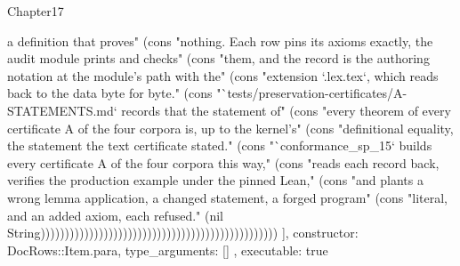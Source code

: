 \begin{lexlean}{Chapter17}
\begin{semanticmodule}
{{a definition that proves" (cons "nothing. Each row pins its axioms exactly, the audit module prints and checks" (cons "them, and the record is the authoring notation at the module's path with the" (cons "extension `.lex.tex`, which reads back to the data byte for byte." (cons "`tests/preservation-certificates/A-STATEMENTS.md` records that the statement of" (cons "every theorem of every certificate A of the four corpora is, up to the kernel's" (cons "definitional equality, the statement the text certificate stated." (cons "`conformance_sp_15` builds every certificate A of the four corpora this way," (cons "reads each record back, verifies the production example under the pinned Lean," (cons "and plants a wrong lemma application, a changed statement, a forged program" (cons "literal, and an added axiom, each refused." (nil String)))))))))))))))))))))))))))))))))))))))))))))))))
    ],
    constructor: DocRows::Item.para,
    type_arguments: []
  },
  executable: true
}


\end{semanticmodule}
\end{lexlean}
